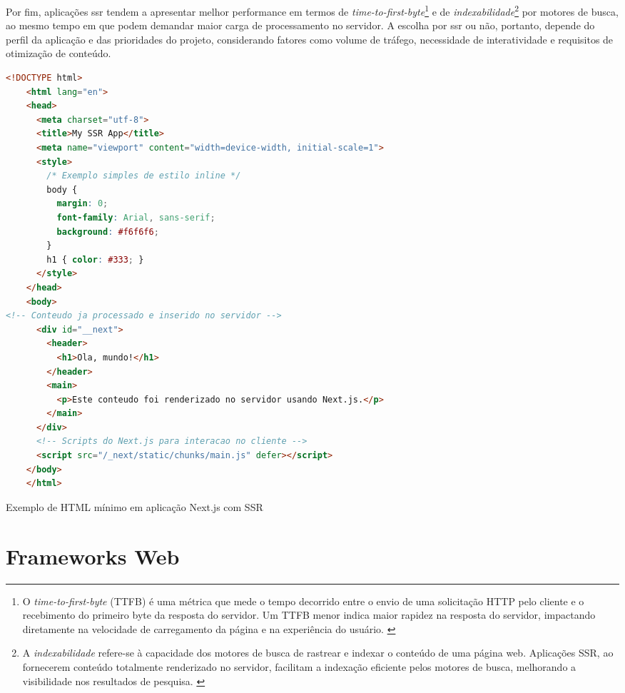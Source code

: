 Por fim, aplicações \acrshort{ssr} tendem a apresentar melhor performance em termos de \emph{time-to-first-byte}\footnote{O \emph{time-to-first-byte} (TTFB) é uma métrica que mede o tempo decorrido entre o envio de uma solicitação HTTP pelo cliente e o recebimento do primeiro byte da resposta do servidor. Um TTFB menor indica maior rapidez na resposta do servidor, impactando diretamente na velocidade de carregamento da página e na experiência do usuário. \cite{ttfb-craig}} e de \emph{indexabilidade}\footnote{A \emph{indexabilidade} refere-se à capacidade dos motores de busca de rastrear e indexar o conteúdo de uma página web. Aplicações SSR, ao fornecerem conteúdo totalmente renderizado no servidor, facilitam a indexação eficiente pelos motores de busca, melhorando a visibilidade nos resultados de pesquisa. \cite{ttfb-oskay}} por motores de busca, ao mesmo tempo em que podem demandar maior carga de processamento no servidor. A escolha por \acrshort{ssr} ou não, portanto, depende do perfil da aplicação e das prioridades do projeto, considerando fatores como volume de tráfego, necessidade de interatividade e requisitos de otimização de conteúdo.

\begin{codigo}[H]
  \begin{lstlisting}[language=html]
    <!DOCTYPE html>
    <html lang="en">
    <head>
      <meta charset="utf-8">
      <title>My SSR App</title>
      <meta name="viewport" content="width=device-width, initial-scale=1">
      <style>
        /* Exemplo simples de estilo inline */
        body {
          margin: 0;
          font-family: Arial, sans-serif;
          background: #f6f6f6;
        }
        h1 { color: #333; }
      </style>
    </head>
    <body>
<!-- Conteudo ja processado e inserido no servidor -->
      <div id="__next">
        <header>
          <h1>Ola, mundo!</h1>
        </header>
        <main>
          <p>Este conteudo foi renderizado no servidor usando Next.js.</p>
        </main>
      </div>
      <!-- Scripts do Next.js para interacao no cliente -->
      <script src="/_next/static/chunks/main.js" defer></script>
    </body>
    </html>
  \end{lstlisting}
  \caption{Exemplo de HTML mínimo em aplicação Next.js com SSR}
  \label{cod:nextjs_html}
\end{codigo}


\section{Frameworks Web}
\label{sec:frameworks-web}

